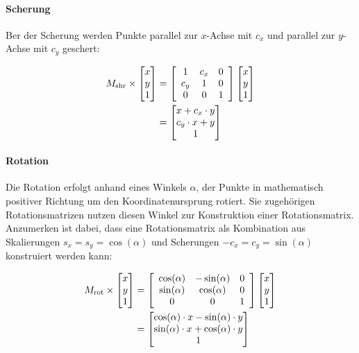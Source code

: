\paragraph{Scherung}
\label{par:scherung}

Ber der Scherung werden Punkte parallel zur $x$-Achse mit $c_x$ und parallel zur $y$-Achse mit $c_y$ geschert:

{\setlength{\belowdisplayskip}{0.5ex}
\begin{align*}
    M_\text{shr} \times \begin{bmatrix} x \\ y \\ 1 \end{bmatrix}
     & =
    \left[
        \begin{array}{ccc}
            1   & c_x & 0 \\
            c_y & 1   & 0 \\
            0   & 0   & 1 \\
        \end{array}
        \right]
    \begin{bmatrix} x \\ y \\ 1 \end{bmatrix} \\
     & =
    \begin{bmatrix} x + c_x \cdot y \\ c_y \cdot x + y \\ 1 \end{bmatrix}
\end{align*}}

\paragraph{Rotation}
\label{par:rotation}

Die Rotation erfolgt anhand eines Winkels $\alpha$, der Punkte in mathematisch positiver Richtung um den Koordinatenursprung rotiert. Sie zugehörigen Rotationsmatrizen nutzen diesen Winkel zur Konstruktion einer Rotationsmatrix. Anzumerken ist dabei, dass eine Rotationsmatrix als Kombination aus Skalierungen $s_x = s_y = \cos(\alpha)$ und Scherungen $-c_x = c_y = \sin(\alpha)$ konstruiert werden kann:

{\setlength{\belowdisplayskip}{0.5ex}
\begin{align*}
    M_\text{rot} \times \begin{bmatrix} x \\ y \\ 1 \end{bmatrix}
     & =
    \left[
        \begin{array}{ccc}
            \cos(\alpha) & -\sin(\alpha) & 0 \\
            \sin(\alpha) & \cos(\alpha)  & 0 \\
            0            & 0             & 1 \\
        \end{array}
        \right]
    \begin{bmatrix} x \\ y \\ 1 \end{bmatrix} \\
     & =
    \begin{bmatrix} \cos(\alpha) \cdot x - \sin(\alpha) \cdot y \\ \sin(\alpha) \cdot x + \cos(\alpha) \cdot y \\ 1 \end{bmatrix}
\end{align*}}

